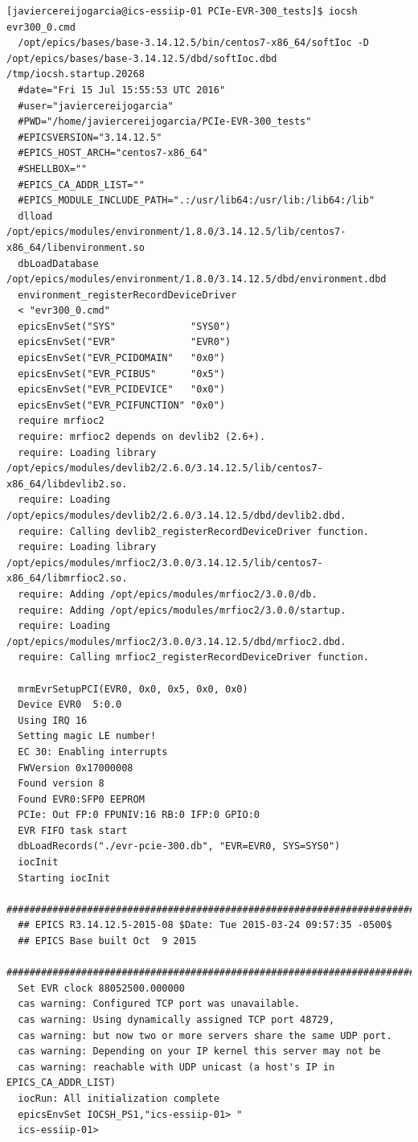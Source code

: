 \documentclass[11pt
  , a4paper
  , article
  , oneside
  , showtrims
]{memoir}
\begin{document}
\begin{lstlisting}[style=termstyle]
  [javiercereijogarcia@ics-essiip-01 PCIe-EVR-300_tests]$ iocsh evr300_0.cmd 
  /opt/epics/bases/base-3.14.12.5/bin/centos7-x86_64/softIoc -D /opt/epics/bases/base-3.14.12.5/dbd/softIoc.dbd /tmp/iocsh.startup.20268
  #date="Fri 15 Jul 15:55:53 UTC 2016"
  #user="javiercereijogarcia"
  #PWD="/home/javiercereijogarcia/PCIe-EVR-300_tests"
  #EPICSVERSION="3.14.12.5"
  #EPICS_HOST_ARCH="centos7-x86_64"
  #SHELLBOX=""
  #EPICS_CA_ADDR_LIST=""
  #EPICS_MODULE_INCLUDE_PATH=".:/usr/lib64:/usr/lib:/lib64:/lib"
  dlload         /opt/epics/modules/environment/1.8.0/3.14.12.5/lib/centos7-x86_64/libenvironment.so
  dbLoadDatabase /opt/epics/modules/environment/1.8.0/3.14.12.5/dbd/environment.dbd
  environment_registerRecordDeviceDriver
  < "evr300_0.cmd"
  epicsEnvSet("SYS"             "SYS0")
  epicsEnvSet("EVR"             "EVR0")
  epicsEnvSet("EVR_PCIDOMAIN"   "0x0")
  epicsEnvSet("EVR_PCIBUS"      "0x5")
  epicsEnvSet("EVR_PCIDEVICE"   "0x0")
  epicsEnvSet("EVR_PCIFUNCTION" "0x0")
  require mrfioc2
  require: mrfioc2 depends on devlib2 (2.6+).
  require: Loading library /opt/epics/modules/devlib2/2.6.0/3.14.12.5/lib/centos7-x86_64/libdevlib2.so.
  require: Loading /opt/epics/modules/devlib2/2.6.0/3.14.12.5/dbd/devlib2.dbd.
  require: Calling devlib2_registerRecordDeviceDriver function.
  require: Loading library /opt/epics/modules/mrfioc2/3.0.0/3.14.12.5/lib/centos7-x86_64/libmrfioc2.so.
  require: Adding /opt/epics/modules/mrfioc2/3.0.0/db.
  require: Adding /opt/epics/modules/mrfioc2/3.0.0/startup.
  require: Loading /opt/epics/modules/mrfioc2/3.0.0/3.14.12.5/dbd/mrfioc2.dbd.
  require: Calling mrfioc2_registerRecordDeviceDriver function.
  
  mrmEvrSetupPCI(EVR0, 0x0, 0x5, 0x0, 0x0)
  Device EVR0  5:0.0
  Using IRQ 16
  Setting magic LE number!
  EC 30: Enabling interrupts
  FWVersion 0x17000008
  Found version 8
  Found EVR0:SFP0 EEPROM
  PCIe: Out FP:0 FPUNIV:16 RB:0 IFP:0 GPIO:0
  EVR FIFO task start
  dbLoadRecords("./evr-pcie-300.db", "EVR=EVR0, SYS=SYS0")
  iocInit
  Starting iocInit
  ############################################################################
  ## EPICS R3.14.12.5-2015-08 $Date: Tue 2015-03-24 09:57:35 -0500$
  ## EPICS Base built Oct  9 2015
  ############################################################################
  Set EVR clock 88052500.000000
  cas warning: Configured TCP port was unavailable.
  cas warning: Using dynamically assigned TCP port 48729,
  cas warning: but now two or more servers share the same UDP port.
  cas warning: Depending on your IP kernel this server may not be
  cas warning: reachable with UDP unicast (a host's IP in EPICS_CA_ADDR_LIST)
  iocRun: All initialization complete
  epicsEnvSet IOCSH_PS1,"ics-essiip-01> "
  ics-essiip-01>
\end{lstlisting}
\end{document}
